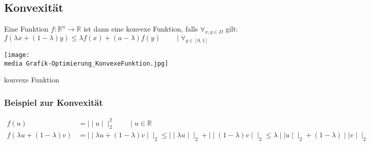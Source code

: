\subsection{Konvexität}

\begin{Def}
Eine Funktion $f: \mathbb{R}^n\rightarrow\mathbb{R}$ ist dann eine konvexe Funktion, falls $\forall_{x,y\in D}$ gilt: 
$f(\lambda x+ (1 - \lambda)y) \leq \lambda f(x)+(a-\lambda)f(y) \qquad \mid \forall_{y\in[0,1]}$

\begin{dsafigure}
\begin{center}
\texttt{[image: \\media Grafik-Optimierung\_KonvexeFunktion.jpg]}
\caption{konvexe Funktion}
\end{center}
\end{dsafigure}

\end{Def}

\subsubsection{Beispiel zur Konvexität}

\begin{align*}
f(u) &=\mid\mid u\mid\mid_2^2\qquad\mid u\in\mathbb{R}\\
f(\lambda u+(1-\lambda)v) &=\mid\mid\lambda u+(1-\lambda)v\mid\mid_2
\leq\mid\mid\lambda u\mid\mid_2+\mid\mid(1-\lambda)v\mid\mid_2
\leq\lambda\mid\mid u\mid\mid_2+(1-\lambda)\mid\mid v\mid\mid_2
\end{align*}